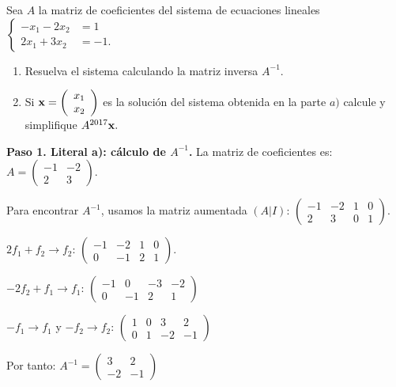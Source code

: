 \begin{prob}
Sea $A$ la matriz de coeficientes del sistema de ecuaciones lineales $\left\lbrace \begin{array}{cc}
-x_1-2x_2&=1\\ 
2x_1+3x_2&=-1. 
\end{array}\right.$

\begin{enumerate}[$a)$]
\item Resuelva el sistema calculando la matriz inversa $A^{-1}.$
\item Si ${\bf x}=\left( \begin{array}{c} x_1 \\ x_2 \end{array} \right)$ es la solución del sistema obtenida en la parte $a)$ calcule y simplifique $A^{2017}{\bf x}.$
\end{enumerate}

\begin{myproof}
\textbf{Paso 1. Literal a): cálculo de $A^{-1}$.} La matriz de coeficientes es: $A = \left( \begin{array}{cc} -1 & -2 \\ 2 & 3 \end{array} \right).$

Para encontrar $A^{-1}$, usamos la matriz aumentada $(A|I)$: $\left(\begin{array}{cc|cc}
-1 & -2 & 1 & 0 \\
2 & 3 & 0 & 1
\end{array}\right).$

$2f_1 + f_2 \to f_2$: $\left(\begin{array}{cc|cc}
-1 & -2 & 1 & 0 \\
0 & -1 & 2 & 1
\end{array}\right).$

$-2f_2 + f_1 \to f_1$: $\left(\begin{array}{cc|cc}
-1 & 0 & -3 & -2 \\
0 & -1 & 2 & 1
\end{array}\right)$

$-f_1 \to f_1$ y $-f_2 \to f_2$: $\left(\begin{array}{cc|cc}
1 & 0 & 3 & 2 \\
0 & 1 & -2 & -1
\end{array}\right)$

Por tanto: $A^{-1} = \left( \begin{array}{cc} 3 & 2 \\ -2 & -1 \end{array} \right)$


\end{myproof}
\end{prob}
